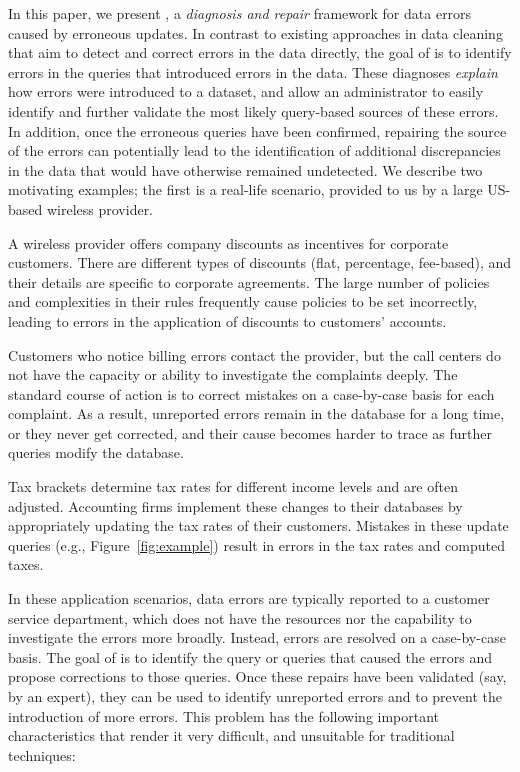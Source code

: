In this paper, we present \sys, a \emph{diagnosis and repair} framework for data errors
caused by erroneous updates. In contrast to existing approaches in data
cleaning that aim to detect and correct errors in the data directly, the goal
of \sys is to identify errors in the queries that introduced errors in the
data. These diagnoses \emph{explain} how errors were introduced to a
dataset, and allow an administrator to easily identify and further validate the most likely query-based sources of these errors. 
In addition, once the erroneous queries have been confirmed, repairing the source of the errors
can potentially lead to the identification of additional discrepancies in
the data that would have otherwise remained undetected.  
We describe two motivating examples; the first is a real-life scenario, provided to us by a large US-based wireless provider.
% 
\begin{example}\label{ex:telco}

A wireless provider offers company discounts as incentives for
corporate customers. There are different types of discounts (flat, percentage,
fee-based), and their details are specific to corporate agreements. The large
number of policies and complexities in their rules frequently cause policies
to be set incorrectly, leading to errors in the application of discounts to
customers' accounts.

Customers who notice billing errors contact the provider, but the call centers
do not have the capacity or ability to investigate the complaints deeply. The
standard course of action is to correct mistakes on a case-by-case
basis for each complaint. As a result, unreported errors remain in the
database for a long time, or they never get corrected, and their cause becomes
harder to trace as further queries modify the database.%

\end{example}
% 
\begin{example}\label{ex:taxes}
    
Tax brackets determine tax rates for different income levels and are
often adjusted. Accounting firms implement these changes to their
databases by appropriately updating the tax rates of their customers. Mistakes
in these update queries (e.g., Figure~\ref{fig:example}) result in errors in
the tax rates and computed taxes. 

\end{example}
% 
In these application scenarios, data errors are typically reported to
a customer service department, which does not have the resources nor
the capability to investigate the errors more broadly. Instead, errors
are resolved on a case-by-case basis. The goal of \sys is to identify
the query or queries that caused the errors and propose corrections to
those queries.  Once these repairs have been validated (say, by an expert), they can be used to identify unreported
errors and to prevent the introduction of more errors. This problem
has the following important characteristics that render it very difficult, and unsuitable for traditional
techniques:


